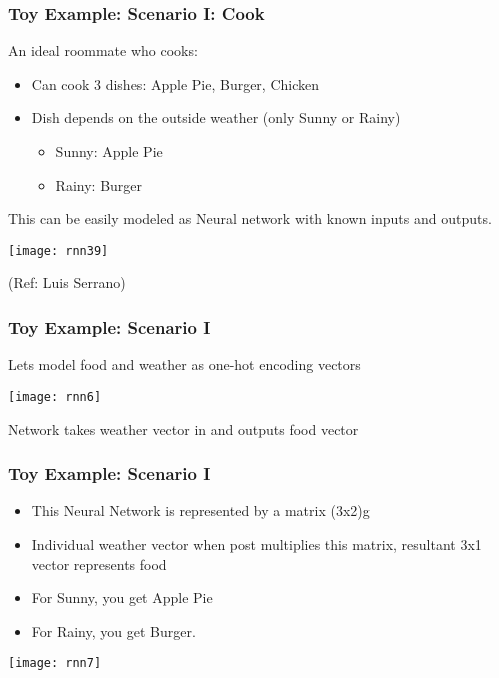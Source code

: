 \begin{frame}[fragile] \frametitle{Toy Example: Scenario I: Cook}
An ideal roommate who cooks:
\begin{itemize}
\item Can cook 3 dishes: Apple Pie, Burger, Chicken
\item Dish depends on the outside weather (only Sunny or Rainy)
\begin{itemize}
\item Sunny: Apple Pie
\item Rainy: Burger
\end{itemize}
\end{itemize}
This can be easily modeled as Neural network with known inputs and outputs.


\begin{center}
\texttt{[image: rnn39]}
\end{center}

{\tiny (Ref: Luis Serrano)}

\end{frame}

\begin{frame}[fragile] \frametitle{Toy Example: Scenario I}
Lets model food and weather as one-hot encoding vectors
\begin{center}
\texttt{[image: rnn6]}
\end{center}
Network takes weather vector in and outputs food vector
\end{frame}

\begin{frame}[fragile] \frametitle{Toy Example: Scenario I}
\begin{itemize}
\item This Neural Network is represented by a matrix (3x2)g
\item Individual weather vector when post multiplies this matrix, resultant 3x1 vector represents food
\item For Sunny, you get Apple Pie
\item For Rainy, you get Burger.
\end{itemize}
\begin{center}
\texttt{[image: rnn7]}
\end{center}
\end{frame}

